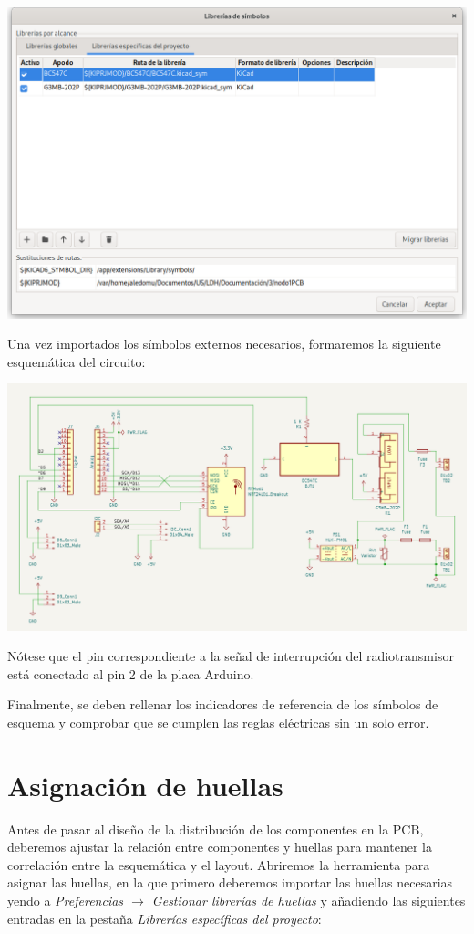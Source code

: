 \includegraphics[width=\linewidth]{symbol-path.png}

Una vez importados los símbolos externos necesarios, formaremos la siguiente
esquemática del circuito:

\includegraphics[width=\linewidth]{schematic-general.png}

Nótese que el pin correspondiente a la señal de interrupción del
radiotransmisor está conectado al pin 2 de la placa Arduino.

Finalmente, se deben rellenar los indicadores de referencia de los símbolos de
esquema y comprobar que se cumplen las reglas eléctricas sin un solo error.

\section{Asignación de huellas}

Antes de pasar al diseño de la distribución de los componentes en la PCB,
deberemos ajustar la relación entre componentes y huellas para mantener la
correlación entre la esquemática y el layout. Abriremos la herramienta para
asignar las huellas, en la que primero deberemos importar las huellas
necesarias yendo a
\emph{Preferencias $\rightarrow$ Gestionar librerías de huellas} y añadiendo
las siguientes entradas en la pestaña
\emph{Librerías específicas del proyecto}:

